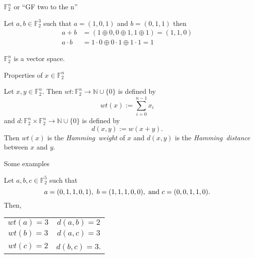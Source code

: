 \documentclass{beamer}
\def\gftwo{\mathbb{F}_2}
\def\nnn{\mathbb{N}}
\begin{document}
\begin{frame}{$\gftwo^n$ or ``GF two to the n''}
\begin{example}
	Let $a,b\in\gftwo^3$ such that $a=(1,0,1)$ and $b=(0,1,1)$ then
	\begin{align*}
		a+b      &=(1\oplus0,0\oplus1,1\oplus1)=(1,1,0) \\
		a\cdot b &=1\cdot0\oplus0\cdot1\oplus1\cdot1=1
	\end{align*}
\end{example}

\begin{fact}
  $\gftwo^n$ is a vector space.
\end{fact}
\end{frame}

\begin{frame}{Properties of $x\in\gftwo^n$}
  \begin{definition}
  \label{def:Hamming}
  	Let $x,y\in\gftwo^n$. Then $wt:\gftwo^n\rightarrow\nnn\cup\{0\}$
    is defined by
  	\[
  	  wt(x):=\sum_{i=0}^{n-1}x_i
  	\]
  	and $d:\gftwo^n\times\gftwo^n\rightarrow\nnn\cup\{0\}$ is defined by
  	\[
  	  d(x,y):=w(x+y).
  	\]
  	Then $wt(x)$ is the {\em Hamming\ weight} of $x$ and $d(x,y)$ is the
  	{\em Hamming\ distance} between $x$ and $y$.
  \end{definition}
  \end{frame}
  
  \begin{frame}{Some examples}
  \begin{example}
  	Let $a,b,c\in\gftwo^5$ such that
  	\[
  	a=(0,1,1,0,1),\ b=(1,1,1,0,0),\ {\rm and}\ c=(0,0,1,1,0).
  	\]
  	Then,
  	\begin{center}
  		\begin{tabular}{c c}
  			$wt(a)=3$&$d(a,b)=2$\\
  			$wt(b)=3$&$d(a,c)=3$\\
  			$wt(c)=2$&$d(b,c)=3$.\\
  		\end{tabular}
  	\end{center}
  \end{example}
\end{frame}
\end{document}
